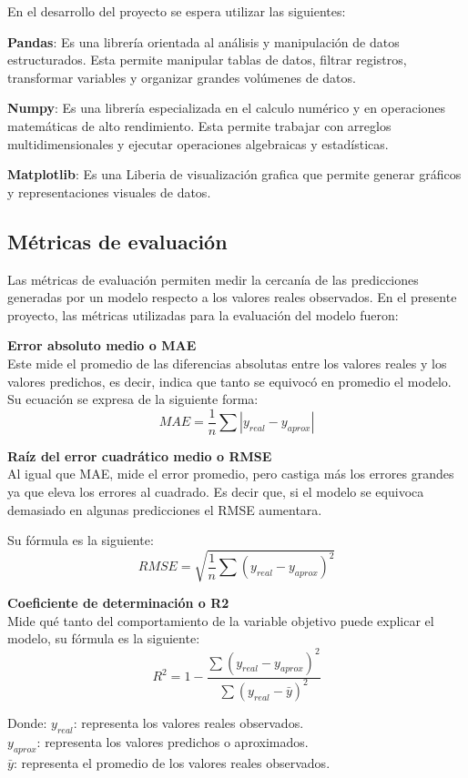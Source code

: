 \documentclass[12pt]{report}
\begin{document}
En el desarrollo del proyecto se espera utilizar las siguientes:

\textbf{Pandas}: Es una librería orientada al análisis y manipulación de datos estructurados. Esta permite manipular tablas de datos, filtrar registros, transformar variables y organizar grandes volúmenes de datos. \cite{pandas_docs}

\textbf{Numpy}: Es una librería especializada en el calculo numérico y en operaciones matemáticas de alto rendimiento. Esta permite trabajar con arreglos multidimensionales y ejecutar operaciones algebraicas y estadísticas. \cite{numpy_docs}

\textbf{Matplotlib}: Es una Liberia de visualización grafica que permite generar gráficos y representaciones visuales de datos. \cite{matplotlib_docs}

\subsection*{Métricas de evaluación}
Las métricas de evaluación permiten medir la cercanía de las predicciones generadas por un modelo respecto a los valores reales observados. En el presente proyecto, las métricas utilizadas para la evaluación del modelo fueron:

\textbf{Error absoluto medio o MAE}\\
Este mide el promedio de las diferencias absolutas entre los valores reales y los valores predichos, es decir, indica que tanto se equivocó en promedio el modelo. Su ecuación se expresa de la siguiente forma:
$$ MAE = \frac{1}{n} \sum |y_{real} - y_{aprox}| $$

\textbf{Raíz del error cuadrático medio o RMSE}\\
Al igual que MAE, mide el error promedio, pero castiga más los errores grandes ya que eleva los errores al cuadrado. Es decir que, si el modelo se equivoca demasiado en algunas predicciones el RMSE aumentara. 

Su fórmula es la siguiente:
$$ RMSE = \sqrt{\frac{1}{n} \sum (y_{real} - y_{aprox})^2} $$

\textbf{Coeficiente de determinación o R2}\\
Mide qué tanto del comportamiento de la variable objetivo puede explicar el modelo, su fórmula es la siguiente:
$$ R^2 = 1 - \frac{\sum (y_{real} - y_{aprox})^2}{\sum (y_{real} - \bar{y})^2} $$

Donde:
$y_{real}$: representa los valores reales observados.\\
$y_{aprox}$: representa los valores predichos o aproximados.\\
$\bar{y}$: representa el promedio de los valores reales observados.\\
\end{document}
